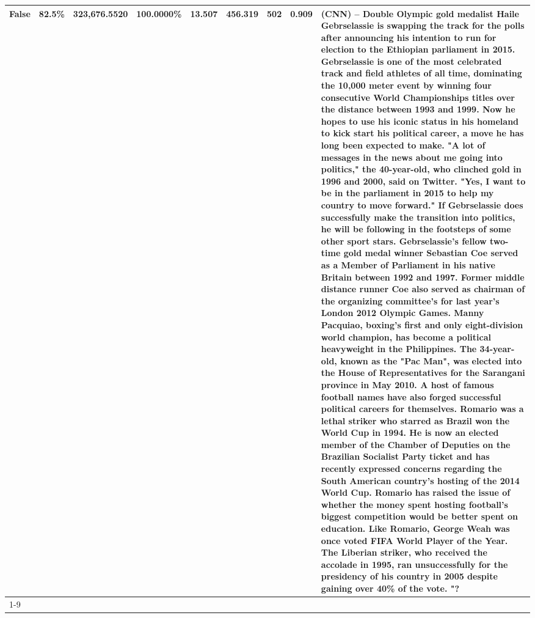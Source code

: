 \begin{table}[H]
{\begin{tabular}{lllrlllll}
False & 82.5\% & 323,676.5520 & \bfseries \color{red} 100.0000\% & 13.507 & 456.319 & 502 & 0.909 & (CNN) -- Double Olympic gold medalist Haile Gebrselassie is swapping the track for the polls after announcing his intention to run for election to the Ethiopian parliament in 2015. Gebrselassie is one of the most celebrated track and field athletes of all time, dominating the 10,000 meter event by winning four consecutive World Championships titles over the distance between 1993 and 1999. Now he hopes to use his iconic status in his homeland to kick start his political career, a move he has long been expected to make. "A lot of messages in the news about me going into politics," the 40-year-old, who clinched gold in 1996 and 2000, said on Twitter. "Yes, I want to be in the parliament in 2015 to help my country to move forward." If Gebrselassie does successfully make the transition into politics, he will be following in the footsteps of some other sport stars. Gebrselassie's fellow two-time gold medal winner Sebastian Coe served as a Member of Parliament in his native Britain between 1992 and 1997. Former middle distance runner Coe also served as chairman of the organizing committee's for last year's London 2012 Olympic Games. Manny Pacquiao, boxing's first and only eight-division world champion, has become a political heavyweight in the Philippines. The 34-year-old, known as the "Pac Man", was elected into the House of Representatives for the Sarangani province in May 2010. A host of famous football names have also forged successful political careers for themselves. Romario was a lethal striker who starred as Brazil won the World Cup in 1994. He is now an elected member of the Chamber of Deputies on the Brazilian Socialist Party ticket and has recently expressed concerns regarding the South American country's hosting of the 2014 World Cup. Romario has raised the issue of whether the money spent hosting football's biggest competition would be better spent on education. Like Romario, George Weah was once voted FIFA World Player of the Year. The Liberian striker, who received the accolade in 1995, ran unsuccessfully for the presidency of his country in 2005 despite gaining over 40\% of the vote. "? \\
\cline{1-9}

\end{tabular}}
\end{table}
